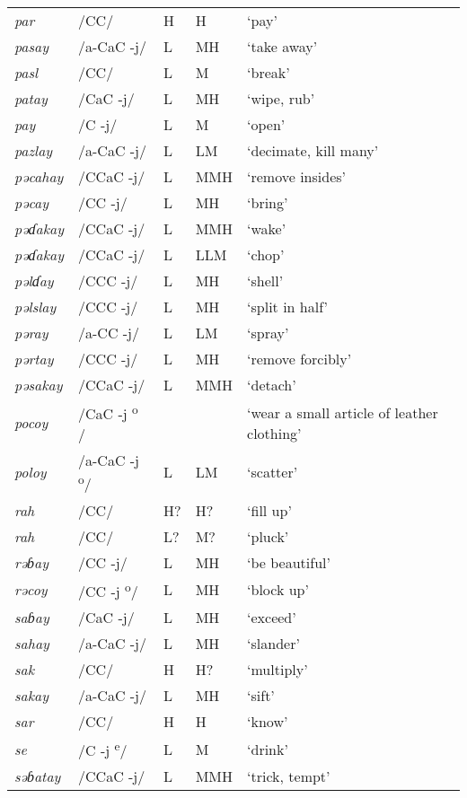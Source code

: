 \begin{small}
\begin{longtable}{lp{1.75cm}p{1.75cm}p{1.75cm}p{3cm}}
\textit{par} & /CC/ & H & H & ‘pay’\\
\textit{pasay} & /a-CaC -j/ & L & MH & ‘take away’\\
\textit{pasl} & /CC/ & L & M & ‘break’\\
\textit{patay} & /CaC -j/ & L & MH & ‘wipe, rub’\\
\textit{pay} & /C -j/ & L & M & ‘open’\\
\textit{pazlay} & /a-CaC -j/ & L & LM & ‘decimate, kill many’\\
\textit{pəcahay} & /CCaC -j/ & L & MMH & ‘remove insides’\\
\textit{pəcay} & /CC -j/ & L & MH & ‘bring’\\
\textit{pəɗakay} & /CCaC -j/ & L & MMH & ‘wake’\\
\textit{pəɗakay} & /CCaC -j/ & L & LLM & ‘chop’\\
\textit{pəl}\textit{ɗ}\textit{ay} & /CCC -j/ & L & MH & ‘shell’\\
\textit{pəlslay} & /CCC -j/ & L & MH & ‘split in half’\\
\textit{pəray} & /a-CC -j/ & L & LM & ‘spray’\\
\textit{pərtay} & /CCC -j/ & L & MH & ‘remove forcibly’\\
\textit{pəsakay} & /CCaC -j/ & L & MMH & ‘detach’\\
\textit{pocoy} & /CaC -j\textsuperscript{ o} / &  &  & ‘wear a small article of leather clothing’\\
\textit{poloy} & /a-CaC -j\textsuperscript{ o}/ & L & LM & ‘scatter’\\
\textit{rah} & /CC/ & H? & H? & ‘fill up’\\
\textit{rah} & /CC/ & L? & M? & ‘pluck’\\
\textit{rəɓay} & /CC -j/ & L & MH & ‘be beautiful’\\
\textit{rəcoy} & /CC -j\textsuperscript{ o}/ & L & MH & ‘block up’\\
\textit{saɓay} & /CaC -j/ & L & MH & ‘exceed’\\
\textit{sahay} & /a-CaC -j/ & L & MH & ‘slander’\\
\textit{sak} & /CC/ & H & H? & ‘multiply’\\
\textit{sakay} & /a-CaC -j/ & L & MH & ‘sift’\\
\textit{sar} & /CC/ & H & H & ‘know’\\
\textit{se} & /C -j \textsuperscript{e}/ & L & M & ‘drink’\\
\textit{səɓatay} & /CCaC -j/ & L & MMH & ‘trick, tempt’\\

\end{longtable}
\end{small}
